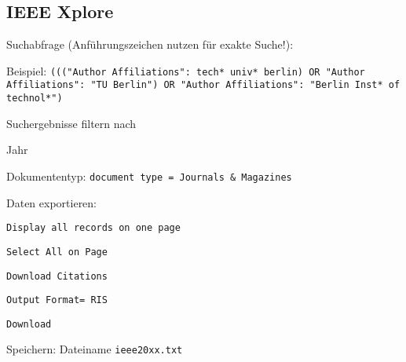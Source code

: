 \subsection*{IEEE Xplore}
\begin{compactitem}
\item Suchabfrage (Anführungszeichen nutzen für exakte Suche!):
	\begin{compactitem}
    \item Beispiel: \texttt{((("{}Author Affiliations"{}: tech* univ* berlin) OR "{}Author \newline Affiliations"{}: "{}TU Berlin"{}) OR "{}Author Affiliations"{}: "{}Berlin Inst* of technol*"{})}
    \end{compactitem}
\item Suchergebnisse filtern nach
	\begin{compactitem}
    \item Jahr
    \item Dokumententyp: \texttt{document type = Journals \& Magazines}
    \end{compactitem}
\item Daten exportieren: 
	\begin{compactitem}
	\item \texttt{Display all records on one page}
    \item \texttt{Select All on Page}
    \item \texttt{Download Citations}
    \item \texttt{Output Format= RIS}
    \item \texttt{Download} 
	\end{compactitem}
\item Speichern: Dateiname \texttt{ieee20xx.txt}
\end{compactitem}


